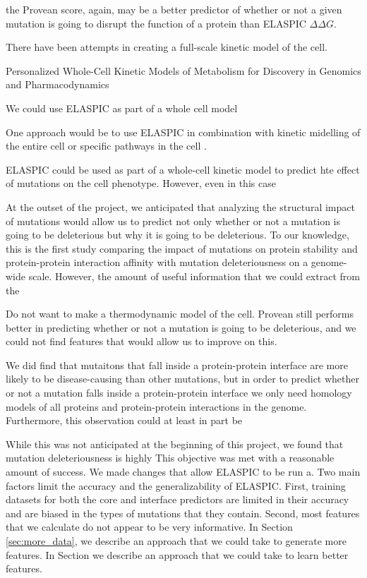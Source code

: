 the Provean score, again, may be a better predictor of whether or not a given mutation is going to disrupt the function of a protein than ELASPIC $\Delta \Delta G$.

There have been attempts in creating a full-scale kinetic model of the cell.

Personalized Whole-Cell Kinetic Models of Metabolism for Discovery in Genomics and Pharmacodynamics

We could use ELASPIC as part of a whole cell model

One approach would be to use ELASPIC in combination with kinetic midelling of the entire cell or specific pathways in the cell \cite{karr_whole-cell_2012}.

ELASPIC could be used as part of a whole-cell kinetic model \cite{karr_whole-cell_2012} to predict hte effect of mutations on the cell phenotype.
However, even in this case

At the outset of the project, we anticipated that analyzing the structural impact of mutations would allow us to predict not only whether or not a mutation is going to be deleterious but why it is going to be deleterious. To our knowledge, this is the first study comparing the impact of mutations on protein stability and protein-protein interaction affinity with mutation deleteriousness on a genome-wide scale. However, the amount of useful information that we could extract from the

Do not want to make a thermodynamic model of the cell. Provean still performs better in predicting whether or not a mutation is going to be deleterious, and we could not find features that would allow us to improve on this.

We did find that mutaitons that fall inside a protein-protein interface are more likely to be disease-causing than other mutations, but in order to predict whether or not a mutation falls inside a protein-protein interface we only need homology models of all proteins and protein-protein interactions in the genome. Furthermore, this observation could at least in part be

While this was not anticipated at the beginning of this project, we found that mutation deleteriousness is highly This objective was met with a reasonable amount of success. We made changes that allow ELASPIC to be run a. Two main factors limit the accuracy and the generalizability of ELASPIC. First, training datasets for both the core and interface predictors are limited in their accuracy and are biased in the types of mutations that they contain. Second, most features that we calculate do not appear to be very informative. In Section \ref{sec:more_data}, we describe an approach that we could take to generate more features. In Section \label{sec:better_features} we describe an approach that we could take to learn better features.

